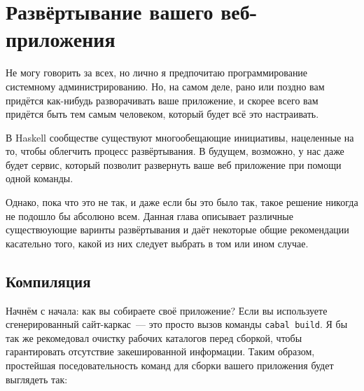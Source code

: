 \chapter{Развёртывание вашего веб-приложения}\label{chap:deploying}
%
%

Не могу говорить за всех, но лично я предпочитаю программирование системному администрированию. Но, на самом деле, рано или поздно вам придётся как-нибудь разворачивать ваше приложение, и скорее всего вам придётся быть тем самым человеком, который будет всё это настраивать. 

%
В Haskell сообществе существуют многообещающие инициативы, нацеленные на то, чтобы облегчить процесс развёртывания. В будущем, возможно, у нас даже будет сервис, который позволит развернуть ваше веб приложение при помощи одной команды.

%
Однако, пока что это не так, и даже если бы это было так, такое решение никогда не подошло бы абсолюно всем. Данная глава описывает различные существюующие варинты развёртывания и даёт некоторые общие рекомендации касательно того, какой из них следует выбрать в том или ином случае.

\section{Компиляция}
%
%
Начнём с начала: как вы собираете своё приложение? Если вы используете сгенерированный сайт-каркас~--- это просто вызов команды \lstinline{cabal build}. Я бы так же рекомедовал очистку рабочих каталогов перед сборкой, чтобы гарантировать отсутствие закешированной информации. Таким образом, простейшая поседовательность команд для сборки вашего приложения будет выглядеть так:

